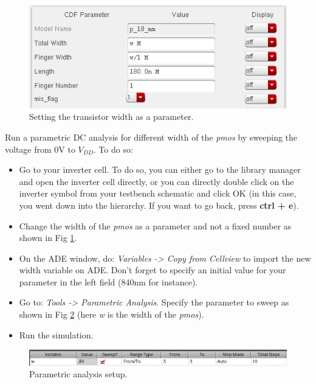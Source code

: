 \begin{enumerate}
	
	
	\parbox[t]{\dimexpr\textwidth-\leftmargin}{%
		\begin{figure}
			\vspace{-0mm}
			\centering
			\vspace{-\baselineskip}
			\includegraphics[scale=0.45]{figures/lab1_schematic_sim/width}
			\caption{Setting the transistor width as a parameter.}
			\label{fig_width}
		\end{figure}
		\item Run a parametric DC analysis for different width of the \textit{pmos} by sweeping the voltage from $0$V to $V_{DD}$. To do so:
		\begin{itemize} 
			\item Go to your inverter cell. To do so, you can either go to the library manager and open the inverter cell directly, or you can directly double click on the inverter symbol from your testbench schematic and click OK (in this case, you went down into the hierarchy. If you want to go back, press \textbf{ctrl + e}).\end{itemize} }
	\begin{itemize} 
		\item Change the width of the \textit{pmos} as a parameter and not a fixed number as shown in Fig \ref{fig_width}.
		\item On the ADE window, do: \textit{Variables -> Copy from Cellview} to import the new width variable on ADE. Don't forget to specify an initial value for your parameter in the left field (840nm for instance).
		\item Go to: \textit{Tools -> Parametric Analysis}. Specify the parameter to sweep as shown in Fig \ref{fig_param} (here \textit w is the width of the \textit{pmos}). 
		\item Run the simulation. \end{itemize} 
	
	
	
	\begin{figure}[!h]
		\centering
		\includegraphics[scale=0.55]{figures/lab1_schematic_sim/param}
		\caption{Parametric analysis setup.}
		\label{fig_param}
	\end{figure}
	

\end{enumerate}

